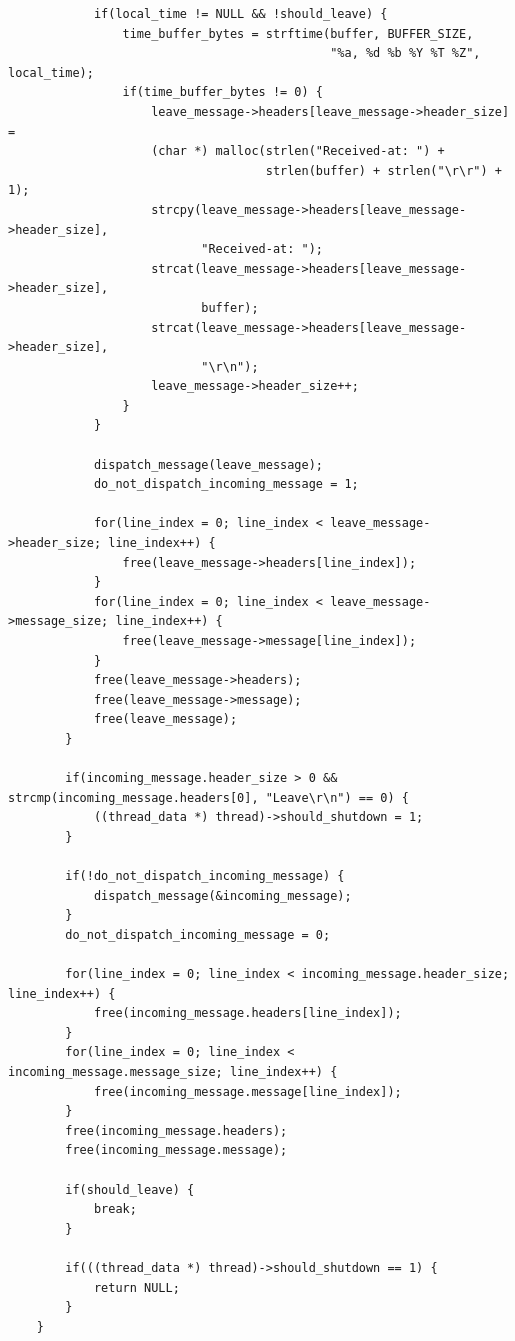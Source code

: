 \documentclass{article}
\begin{document}
\begin{verbatim}
            if(local_time != NULL && !should_leave) {
                time_buffer_bytes = strftime(buffer, BUFFER_SIZE,
                                             "%a, %d %b %Y %T %Z", local_time);
                if(time_buffer_bytes != 0) {
                    leave_message->headers[leave_message->header_size] =
                    (char *) malloc(strlen("Received-at: ") +
                                    strlen(buffer) + strlen("\r\r") + 1);
                    strcpy(leave_message->headers[leave_message->header_size],
                           "Received-at: ");
                    strcat(leave_message->headers[leave_message->header_size],
                           buffer);
                    strcat(leave_message->headers[leave_message->header_size],
                           "\r\n");
                    leave_message->header_size++;
                }
            }
            
            dispatch_message(leave_message);
            do_not_dispatch_incoming_message = 1;
            
            for(line_index = 0; line_index < leave_message->header_size; line_index++) {
                free(leave_message->headers[line_index]);
            }
            for(line_index = 0; line_index < leave_message->message_size; line_index++) {
                free(leave_message->message[line_index]);
            }
            free(leave_message->headers);
            free(leave_message->message);
            free(leave_message);
        }
        
        if(incoming_message.header_size > 0 && strcmp(incoming_message.headers[0], "Leave\r\n") == 0) {
            ((thread_data *) thread)->should_shutdown = 1;
        }
        
        if(!do_not_dispatch_incoming_message) {
            dispatch_message(&incoming_message);
        }
        do_not_dispatch_incoming_message = 0;
        
        for(line_index = 0; line_index < incoming_message.header_size; line_index++) {
            free(incoming_message.headers[line_index]);
        }
        for(line_index = 0; line_index < incoming_message.message_size; line_index++) {
            free(incoming_message.message[line_index]);
        }
        free(incoming_message.headers);
        free(incoming_message.message);
        
        if(should_leave) {
            break;
        }
        
        if(((thread_data *) thread)->should_shutdown == 1) {
            return NULL;
        }
    }
    

\end{verbatim}
\end{document}
